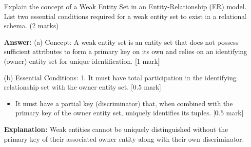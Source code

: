 \begin{tcolorbox}[enhanced,breakable,colback=boxgray,colframe=gray!45,boxrule=0.4pt,arc=2pt,left=6pt,right=6pt,top=4pt,bottom=4pt,title={Q.2},fonttitle=\bfseries\small,coltitle=black,colbacktitle=gray!15]
\small Explain the concept of a Weak Entity Set in an Entity-Relationship (ER) model. List two essential conditions required for a weak entity set to exist in a relational schema. (2 marks)\par\par{}\par\smallskip\textbf{Answer:} (a) Concept: A weak entity set is an entity set that does not possess sufficient attributes to form a primary key on its own and relies on an identifying (owner) entity set for unique identification. [1 mark]\par
(b) Essential Conditions: 1. It must have total participation in the identifying relationship set with the owner entity set. [0.5 mark]\par
\begin{itemize}[leftmargin=1.4em,itemsep=1pt]
\item It must have a partial key (discriminator) that, when combined with the primary key of the owner entity set, uniquely identifies its tuples. [0.5 mark]
\end{itemize}\par\textbf{Explanation:} Weak entities cannot be uniquely distinguished without the primary key of their associated owner entity along with their own discriminator.\par
\end{tcolorbox}


